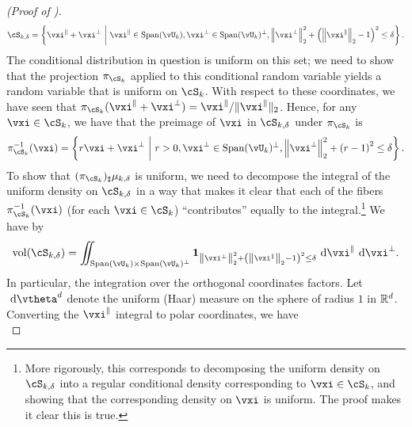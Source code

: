 \documentclass[../../book-main.tex]{subfiles}
\begin{document}
\begin{proof}[(Proof of )]
\begin{equation}
        \cS_{k, \delta} = \set*{
            \vxi^{\|} + \vxi^{\perp} 
            \given 
            \vxi^{\|} \in \Span(\vU_k),
            \vxi^{\perp} \in \Span(\vU_k)^\perp,
            \norm*{\vxi^{\perp}}_2^2
            + \left( \norm*{\vxi^{\|}}_2 - 1 \right)^2
            \leq
            \delta
        }.
    \end{equation}
    The conditional distribution in question is uniform on this set; we need to
    show that the projection $\pi_{\cS_k}$ applied to this conditional random
    variable yields a random variable that is uniform on $\cS_k$.
    With respect to these coordinates, we have seen that $\pi_{\cS_k}(\vxi^\|
    + \vxi^\perp) = \vxi^\| / \norm{\vxi^{\|}}_2$.
    Hence, for any $\vxi \in \cS_{k}$, we have that the preimage of $\vxi$ in
    $\cS_{k, \delta}$ under $\pi_{\cS_k}$ is 
    \begin{equation}
        \pi_{\cS_k}^{-1}(\vxi) = \set*{
            r\vxi + \vxi^\perp 
            \given
            r > 0,
            \vxi^{\perp} \in \Span(\vU_k)^\perp,
            \norm*{\vxi^{\perp}}_2^2
            + \left( r - 1 \right)^2
            \leq
            \delta
        }.
        \label{eq:fiber-of-uos}
    \end{equation}
    To show that $(\pi_{\cS_k})_{\sharp} \mu_{k, \delta}$ is uniform, we need to 
    decompose the integral of the uniform density on $\cS_{k, \delta}$ in a way
    that makes it clear that each of the fibers 
    $\pi_{\cS_k}^{-1}(\vxi)$ (for each $\vxi \in \cS_k$) ``contributes'' equally
    to the integral.\footnote{More rigorously, this corresponds to decomposing
    the uniform density on $\cS_{k, \delta}$ into a regular conditional density
    corresponding to $\vxi \in \cS_{k}$, and showing that the corresponding
    density on $\vxi$ is uniform. The proof makes it clear this is true.}
    We have by 
    \begin{equation}
        \volume(\cS_{k, \delta})
        = \iint_{\Span(\vU_k) \times \Span(\vU_k)^\perp} \mathbf{1}_{
            \norm*{\vxi^{\perp}}_2^2
            + \left( \norm*{\vxi^{\|}}_2 - 1 \right)^2
            \leq
            \delta
        }
        \odif \vxi^{\|} \odif \vxi^{\perp}.
    \end{equation}
    In particular, the integration over the orthogonal coordinates factors. 
    Let $\odif \vtheta^{d}$ denote the uniform (Haar) measure on the sphere of
    radius $1$ in $\mathbb{R}^d$. Converting the $\vxi^{\|}$ integral to polar
    coordinates, we have
    \begin{equation}

\end{equation}
\end{proof}
\end{document}
